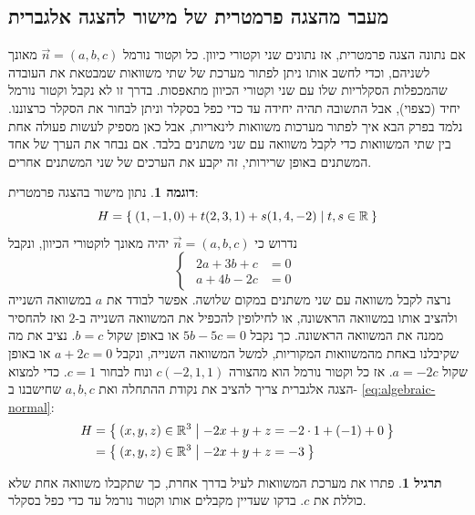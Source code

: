\documentclass[12pt]{report}
\theoremstyle{plain}
\theoremstyle{definition}
\newtheorem{example}{דוגמה}[chapter]
\newtheorem{exercise}{תרגיל}[chapter]
\newcommand{\R}{\mathbb{R}}
\newcommand{\0}{\mathbf{0}}
\begin{document}
\subsection{מעבר מהצגה פרמטרית של מישור להצגה אלגברית}
אם נתונה הצגה פרמטרית, אז נתונים שני וקטורי כיוון. כל וקטור נורמל 
$\vec{n}=(a,b,c)$
מאונך לשניהם, וכדי לחשב אותו ניתן לפתור מערכת של שתי משוואות שמבטאת את העובדה שהמכפלות הסקלריות שלו עם שני וקטורי הכיוון מתאפסות. בדרך זו לא נקבל וקטור נורמל יחיד (כצפוי), אבל התשובה תהיה יחידה עד כדי כפל בסקלר וניתן לבחור את הסקלר כרצוננו. נלמד בפרק הבא איך לפתור מערכות משוואות לינאריות, אבל כאן מספיק לעשות פעולה אחת בין שתי המשוואות כדי לקבל משוואה עם שני משתנים בלבד. אם נבחר את הערך של אחד המשתנים באופן שרירותי, זה יקבע את הערכים של שני המשתנים אחרים.

\begin{example}
נתון מישור בהצגה פרמטרית:
$$
H=\Set{(1,-1,0)+t(2,3,1)+s(1,4,-2)|t,s\in\R}
$$
נדרוש כי
$\vec{n}=(a,b,c)$
יהיה מאונך לוקטורי הכיוון, ונקבל
$$
\begin{cases}
\begin{aligned}
2a+3b+c&=0\\
a+4b-2c&=0
\end{aligned}
\end{cases}
$$
נרצה לקבל משוואה עם שני משתנים במקום שלושה. אפשר לבודד את
$a$
במשוואה השנייה ולהציב אותו במשוואה הראשונה, או לחילופין להכפיל את המשוואה השנייה ב-$2$ ואז להחסיר ממנה את המשוואה הראשונה. כך נקבל
$5b-5c=0$
או באופן שקול
$b=c$.
נציב את מה שקיבלנו באחת מהמשוואות המקוריות, למשל המשוואה השנייה, ונקבל
$a+2c=0$
או באופן שקול
$a=-2c$.
אז כל וקטור נורמל הוא מהצורה 
$c(-2,1,1)$
ונוח לבחור
$c=1$.
כדי למצוא הצגה אלגברית צריך להציב את נקודת ההתחלה ואת
$a,b,c$
שחישבנו ב-
\eqref{eq:algebraic-normal}:
$$
\begin{aligned}
  H&=\Set{(x,y,z)\in\R^3|-2x+y+z=-2\cdot 1+(-1)+0}\\
  &=\Set{(x,y,z)\in\R^3|-2x+y+z=-3}  
\end{aligned}
$$

\end{example}

\begin{exercise}
    פתרו את מערכת המשוואות לעיל בדרך אחרת, כך שתקבלו משוואה אחת שלא כוללת את
    $c$.
    בדקו שעדיין מקבלים אותו וקטור נורמל עד כדי כפל בסקלר.
\end{exercise}
\end{document}
